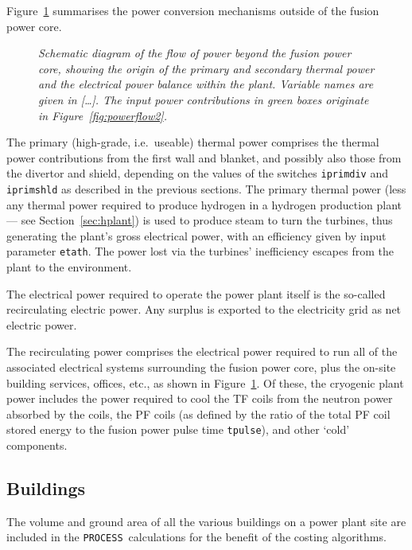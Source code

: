 \documentclass[11pt,a4paper]{report}
\newcommand{\process}{\mbox{\texttt{PROCESS}}}
\begin{document}
Figure~\ref{fig:powerflow3} summarises the power conversion mechanisms outside
of the fusion power core.

\begin{figure}[tbph]
\caption[Power flow outside the fusion power plant core]
{\label{fig:powerflow3} \textit{Schematic diagram of the flow of power beyond
    the fusion power core, showing the origin of the primary and secondary
    thermal power and the electrical power balance within the plant. Variable
    names are given in [\ldots]. The input power contributions in green boxes
    originate in Figure~\ref{fig:powerflow2}. }  }
\end{figure}

The primary (high-grade, i.e.\ useable) thermal power comprises the thermal
power contributions from the first wall and blanket, and possibly also those
from the divertor and shield, depending on the values of the switches
\texttt{iprimdiv} and \texttt{iprimshld} as described in the previous
sections. The primary thermal power (less any thermal power required to
produce hydrogen in a hydrogen production plant --- see
Section~\ref{sec:hplant}) is used to produce steam to turn the turbines, thus
generating the plant's gross electrical power, with an efficiency given by
input parameter \texttt{etath}. The power lost via the turbines' inefficiency
escapes from the plant to the environment.

The electrical power required to operate the power plant itself is the
so-called recirculating electric power. Any surplus is exported to the
electricity grid as net electric power.

The recirculating power comprises the electrical power required to run all of
the associated electrical systems surrounding the fusion power core, plus the
on-site building services, offices, etc., as shown in
Figure~\ref{fig:powerflow3}. Of these, the cryogenic plant power includes the
power required to cool the TF coils from the neutron power absorbed by the
coils, the PF coils (as defined by the ratio of the total PF coil stored
energy to the fusion power pulse time \texttt{tpulse}), and other `cold'
components.

\subsection{Buildings}

The volume and ground area of all the various buildings on a power plant site
are included in the \process\ calculations for the benefit of the costing
algorithms. %
\end{document}
